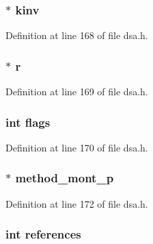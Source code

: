\subsubsection[{\texorpdfstring{kinv}{kinv}}]{$\ast$ kinv}\hypertarget{structdsa__st_ae572b73b513755f46bd9bb97fb0bdcf3}{}\label{structdsa__st_ae572b73b513755f46bd9bb97fb0bdcf3}


Definition at line 168 of file dsa.\+h.

\subsubsection[{\texorpdfstring{r}{r}}]{$\ast$ r}\hypertarget{structdsa__st_acaf81cf110d1af000216b0bb5a57a919}{}\label{structdsa__st_acaf81cf110d1af000216b0bb5a57a919}


Definition at line 169 of file dsa.\+h.

\subsubsection[{\texorpdfstring{flags}{flags}}]{\setlength{\rightskip}{0pt plus 5cm}int flags}\hypertarget{structdsa__st_ac8bf36fe0577cba66bccda3a6f7e80a4}{}\label{structdsa__st_ac8bf36fe0577cba66bccda3a6f7e80a4}


Definition at line 170 of file dsa.\+h.

\subsubsection[{\texorpdfstring{method\+\_\+mont\+\_\+p}{method_mont_p}}]{$\ast$ method\+\_\+mont\+\_\+p}\hypertarget{structdsa__st_a1776a39a1c2f2f04681674ba90a74d66}{}\label{structdsa__st_a1776a39a1c2f2f04681674ba90a74d66}


Definition at line 172 of file dsa.\+h.

\subsubsection[{\texorpdfstring{references}{references}}]{\setlength{\rightskip}{0pt plus 5cm}int references}\hypertarget{structdsa__st_a146fdb34d9a909e530adf8b189481195}{}\label{structdsa__st_a146fdb34d9a909e530adf8b189481195}


